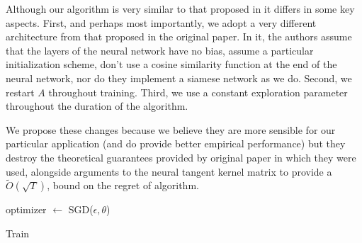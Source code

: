\documentclass{article}
\begin{document}
Although our algorithm is very similar to that proposed in \cite{neuralucb} it differs in some key aspects.
First, and perhaps most importantly, we adopt a very different architecture from that proposed in the original paper.
In it, the authors assume that the layers of the neural network have no bias, assume a particular initialization scheme, don't use a cosine similarity function at the end of the neural network, nor do they implement a siamese network as we do.
Second, we restart $A$ throughout training. Third, we use a constant exploration parameter throughout the duration of the algorithm.

We propose these changes because we believe they are more sensible for our particular application (and do provide better empirical performance) but they destroy the theoretical guarantees provided by original paper in which they were used, alongside arguments to the  neural tangent kernel matrix \cite{neuraltangentkernel} to provide a $\tilde{O}(\sqrt{T})$, bound on the regret of algorithm.

\begin{algorithm}
  \label{algo:train}

    optimizer $\gets$ SGD($\epsilon, \theta$)\;
    \caption{Train}
  \end{algorithm}
\end{document}
